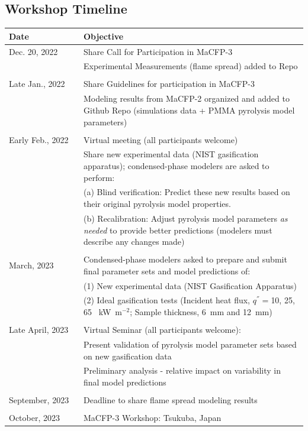 \documentclass[12pt]{article}
\begin{document}
\subsection{Workshop Timeline}
\label{Timeline}
\begin{table}[htb]
\begin{tabular}{p{0.25\linewidth} | p{0.75\linewidth}}
\hline
\textbf{Date}       	& \textbf{Objective} \\
\hline
Dec. 20, 2022	& Share Call for Participation in MaCFP-3\\
& Experimental Measurements (flame spread) added to Repo\\ 
\\
Late Jan., 2022    	& Share Guidelines for participation in MaCFP-3 \\
& Modeling results from MaCFP-2 organized and added to Github Repo (simulations data + PMMA pyrolysis model parameters)\\ 
\\
Early Feb., 2022  	& Virtual meeting (all participants welcome)\\
&Share new experimental data (NIST gasification apparatus); condensed-phase modelers are asked to perform:\\ 
&(a) Blind verification: Predict these new results based on their original pyrolysis model properties. \\ 
&(b) Recalibration: Adjust pyrolysis model parameters \textit{as needed} to provide better predictions (modelers must describe any changes made)\\ 
\\
March, 2023  &Condensed-phase modelers asked to prepare and submit final parameter sets and model predictions of: \\
&{ }(1) New experimental data (NIST Gasification Apparatus)\\    
&{ }(2) Ideal gasification tests (Incident heat flux, $q^{''}=$10, 25, 65 ~kW~m$^{-2}$; Sample thickness, 6~mm and 12~mm)\\
\\
Late April, 2023           	& Virtual Seminar (all participants welcome):\\ 
& Present validation of pyrolysis model parameter sets based on new gasification data \\ 
&Preliminary analysis - relative impact on variability in final model predictions\\
\\
September, 2023 	& Deadline to share flame spread modeling results \\ {}\\
October, 2023   	& MaCFP-3 Workshop: Tsukuba, Japan \\
\hline
\end{tabular}
\end{table}
\end{document}
